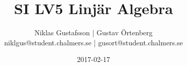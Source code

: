 \documentclass{article}
\title{SI LV5 Linjär Algebra}
\author{Niklas Gustafsson | Gustav Örtenberg  \\ \small{niklgus@student.chalmers.se} | \small{gusort@student.chalmers.se}}
\date{2017-02-17}
\begin{document}
\maketitle
\section{}


\section{}


\newpage
\section{}


\section{}


\section{}


\section{}

\end{document}
